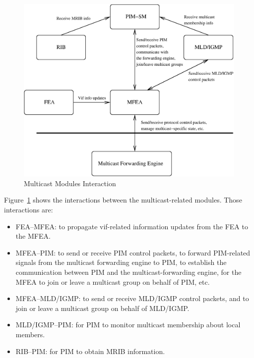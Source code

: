 \documentclass[11pt]{article}
\begin{document}
\begin{figure}[htbp]
  \begin{center}
    \includegraphics[scale=0.5]{figs/mcast_modules_interaction}
    \caption{Multicast Modules Interaction}
    \label{fig:mcast_modules_interaction}
  \end{center}
\end{figure}

Figure~\ref{fig:mcast_modules_interaction} shows the interactions between
the multicast-related modules. Those interactions are:

\begin{itemize}

  \item FEA--MFEA: to propagate vif-related information updates from the
   FEA to the MFEA.

  \item MFEA--PIM: to send or receive PIM control packets, to forward
   PIM-related signals from the multicast forwarding engine to PIM, to
   establish the communication between PIM and the multicast-forwarding
   engine, for the MFEA to join or leave a multicast group on behalf of
   PIM, etc.

  \item MFEA--MLD/IGMP: to send or receive MLD/IGMP control
  packets, and to join or leave a multicast group on behalf of
  MLD/IGMP.

  \item MLD/IGMP--PIM: for PIM to monitor multicast membership about
  local members.

  \item RIB--PIM: for PIM to obtain MRIB information.

\end{itemize}
\end{document}
